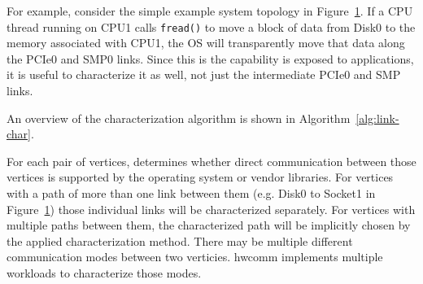 \begin{figure}
    \centering
    \caption[A simple example topology]{}
    \label{fig:simple-topology}
\end{figure}

For example, consider the simple example system topology in Figure~\ref{fig:simple-topology}.
If a CPU thread running on CPU1 calls \texttt{fread()} to move a block of data from Disk0 to the memory associated with CPU1, the OS will transparently move that data along the PCIe0 and SMP0 links.
Since this is the capability is exposed to applications, it is useful to characterize it as well, not just the intermediate PCIe0 and SMP links.

An overview of the characterization algorithm is shown in Algorithm~\ref{alg:link-char}.


For each pair of vertices,  determines whether direct communication between those vertices is supported by the operating system or vendor libraries.
For vertices with a path of more than one link between them (e.g. Disk0 to Socket1 in Figure~\ref{fig:simple-topology}) those individual links will be characterized separately.
For vertices with multiple paths between them, the characterized path will be implicitly chosen by the applied characterization method.
There may be multiple different communication modes between two verticies.
hwcomm implements multiple workloads to characterize those modes.

